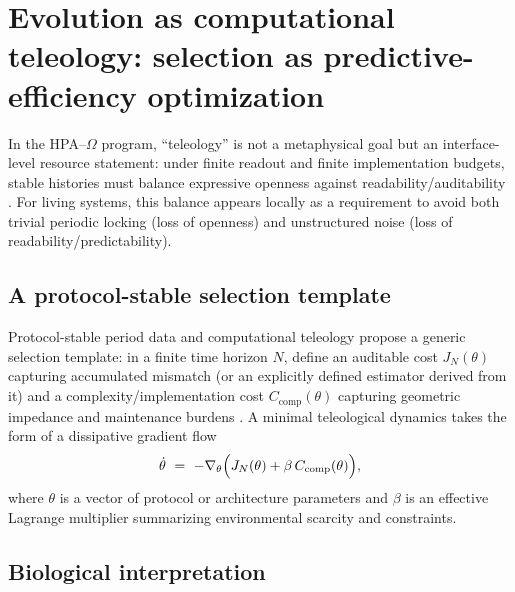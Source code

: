 \section{Evolution as computational teleology: selection as predictive-efficiency optimization}
\label{sec:evolution_teleology}

In the HPA--$\Omega$ program, ``teleology'' is not a metaphysical goal but an interface-level resource statement: under finite readout and finite implementation budgets, stable histories must balance expressive openness against readability/auditability \cite{Ma2025CT}.
For living systems, this balance appears locally as a requirement to avoid both trivial periodic locking (loss of openness) and unstructured noise (loss of readability/predictability).

\subsection{A protocol-stable selection template}
\label{sec:protocol_stable_template}

Protocol-stable period data and computational teleology propose a generic selection template: in a finite time horizon $N$, define an auditable cost $J_N(\theta)$ capturing accumulated mismatch (or an explicitly defined estimator derived from it) and a complexity/implementation cost $C_{\mathrm{comp}}(\theta)$ capturing geometric impedance and maintenance burdens \cite{Ma2025PSPD}.
A minimal teleological dynamics takes the form of a dissipative gradient flow
\begin{equation}
  \dot\theta\ =\ -\nabla_\theta\Bigl(J_N(\theta) + \beta\, C_{\mathrm{comp}}(\theta)\Bigr),
  \label{eq:teleology_gradient_flow}
\end{equation}
where $\theta$ is a vector of protocol or architecture parameters and $\beta$ is an effective Lagrange multiplier summarizing environmental scarcity and constraints.

\subsection{Biological interpretation}
\label{sec:bio_interpretation}

